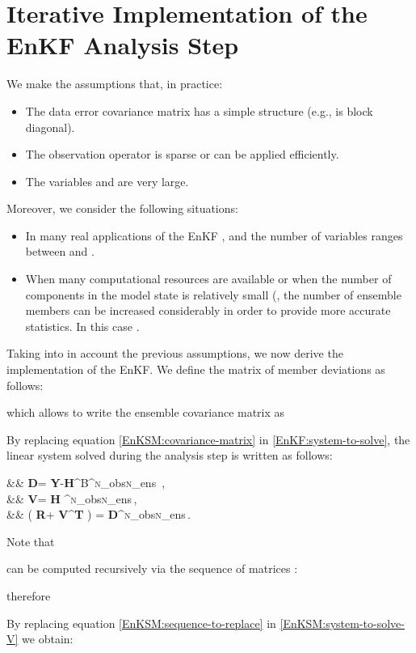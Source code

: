 \documentclass[12pt]{article}
\newcommand{\Nobs}{\textsc{n}_{{\rm obs}}}
\newcommand{\Nens}{\textsc{n}_{{\rm ens}}}
\newcommand{\XB}{{\bf X}^{\rm B}}
\newcommand{\R}{{\bf R}}
\renewcommand{\S}{{\bf S}}
\newcommand{\Z}{{\bf Z}}
\newcommand{\D}{{\bf D}}
\newcommand{\V}{{\bf V}}
\newcommand{\Y}{{\bf Y}}
\newcommand{\Lo}{{\bf H}}
\renewcommand{\Re}{\mathbbm{R}}
\begin{document}
\section{Iterative Implementation of the EnKF Analysis Step}
\label{sec:enkfSherman}


We make the assumptions \cite{Tippett2003,Jan06} that, in practice:
\begin{itemize}
 \item The data error covariance matrix  has a simple structure (e.g., is block diagonal). 
 \item The observation operator  is sparse or can be applied efficiently.
 \item The variables  and  are very large.
\end{itemize}
Moreover, we consider the following situations:
\begin{itemize}
 \item In many real applications of the EnKF , and the number of variables ranges between  and .
 \item When many computational resources are available or when the number of components in the model state is relatively small  (, the number of ensemble members can be increased considerably in order to provide more accurate statistics. In this case . 
\end{itemize}

Taking into in account the previous assumptions, we now derive the implementation of the EnKF. We define the matrix of member deviations  as follows:

which allows to write the ensemble covariance matrix as

By replacing equation \eqref{EnKSM:covariance-matrix} in \eqref{EnKF:system-to-solve}, the linear system solved during the analysis step is written as follows:

\label{EnKSM:system-rhs}
&& \D = \Y-\Lo \cdot \XB \in \Re^{\Nobs \times \Nens} \,, \\
\label{EnKSM:member-observations}
&& \V = {\Lo} \cdot \S  \in \Re^{\Nobs \times \Nens}\,,\\
\label{EnKSM:system-to-solve-V}
&& \left( \R + \V \cdot \V^{\bf T} \right) \cdot \Z = \D \in \Re^{\Nobs \times \Nens}\,.

Note that

can be computed recursively via the sequence of matrices :

therefore

By replacing equation \eqref{EnKSM:sequence-to-replace} in \eqref{EnKSM:system-to-solve-V} we obtain:
\end{document}
